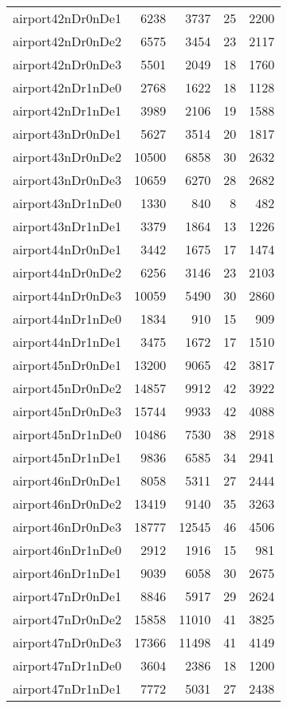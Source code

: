 \begin{longtable}{lrrrr}
airport42nDr0nDe1 & 6238 & 3737 & 25 & 2200 \\
airport42nDr0nDe2 & 6575 & 3454 & 23 & 2117 \\
airport42nDr0nDe3 & 5501 & 2049 & 18 & 1760 \\
airport42nDr1nDe0 & 2768 & 1622 & 18 & 1128 \\
airport42nDr1nDe1 & 3989 & 2106 & 19 & 1588 \\
airport43nDr0nDe1 & 5627 & 3514 & 20 & 1817 \\
airport43nDr0nDe2 & 10500 & 6858 & 30 & 2632 \\
airport43nDr0nDe3 & 10659 & 6270 & 28 & 2682 \\
airport43nDr1nDe0 & 1330 & 840 & 8 & 482 \\
airport43nDr1nDe1 & 3379 & 1864 & 13 & 1226 \\
airport44nDr0nDe1 & 3442 & 1675 & 17 & 1474 \\
airport44nDr0nDe2 & 6256 & 3146 & 23 & 2103 \\
airport44nDr0nDe3 & 10059 & 5490 & 30 & 2860 \\
airport44nDr1nDe0 & 1834 & 910 & 15 & 909 \\
airport44nDr1nDe1 & 3475 & 1672 & 17 & 1510 \\
airport45nDr0nDe1 & 13200 & 9065 & 42 & 3817 \\
airport45nDr0nDe2 & 14857 & 9912 & 42 & 3922 \\
airport45nDr0nDe3 & 15744 & 9933 & 42 & 4088 \\
airport45nDr1nDe0 & 10486 & 7530 & 38 & 2918 \\
airport45nDr1nDe1 & 9836 & 6585 & 34 & 2941 \\
airport46nDr0nDe1 & 8058 & 5311 & 27 & 2444 \\
airport46nDr0nDe2 & 13419 & 9140 & 35 & 3263 \\
airport46nDr0nDe3 & 18777 & 12545 & 46 & 4506 \\
airport46nDr1nDe0 & 2912 & 1916 & 15 & 981 \\
airport46nDr1nDe1 & 9039 & 6058 & 30 & 2675 \\
airport47nDr0nDe1 & 8846 & 5917 & 29 & 2624 \\
airport47nDr0nDe2 & 15858 & 11010 & 41 & 3825 \\
airport47nDr0nDe3 & 17366 & 11498 & 41 & 4149 \\
airport47nDr1nDe0 & 3604 & 2386 & 18 & 1200 \\
airport47nDr1nDe1 & 7772 & 5031 & 27 & 2438 \\

\end{longtable}
